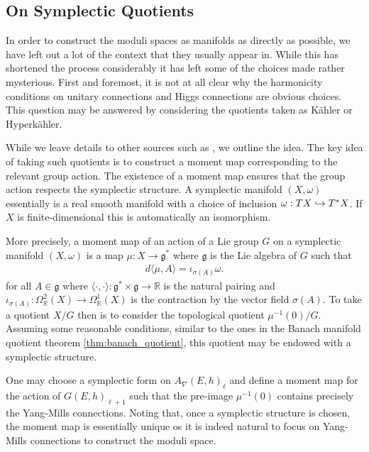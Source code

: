 \documentclass[12pt]{ociamthesis}  %
\begin{document}
\subsection{On Symplectic Quotients}\label{sec:symplectic_quotients}

In order to construct the moduli spaces as manifolds as directly as
possible, we have left out a lot of the context that they usually appear
in. While this has shortened the process considerably it has left
some of the choices made rather mysterious. First and foremost, it is
not at all clear why the harmonicity conditions on unitary connections and
Higgs connections are obvious choices. This question may be
answered by considering the quotients taken as K\"ahler or Hyperk\"ahler.

While we leave details to other sources such as \missingcitation,
we outline the idea. The key idea of taking such quotients is to
construct a moment map corresponding to the relevant group action.
The existence of a moment map ensures that the group action respects
the symplectic structure. A symplectic manifold $(X,\omega)$
essentially is a real smooth manifold with a choice of inclusion
$\omega : TX \hookrightarrow T^*X$. If $X$ is finite-dimensional this is
automatically an isomorphism.

More precisely, a moment map of an action of a Lie group $G$ on a symplectic manifold
$(X,\omega)$ is a map $\mu : X \to \mathfrak g^*$
where $\mathfrak g$ is the Lie algebra of $G$ such that
\begin{align*}
  d\langle\mu,A\rangle = \iota_{\sigma(A)}\omega.
\end{align*}
for all $A\in\mathfrak g$ where $\langle \cdot,\cdot\rangle : \mathfrak g^* \times \mathfrak g \to \mathbb R$
is the natural pairing and $\iota_{\sigma(A)} : \Omega^2_{\mathbb R}(X)\to \Omega^1_{\mathbb R}(X)$
is the contraction by the vector field $\sigma(A)$. To take a
quotient $X/G$ then is to consider the topological quotient $\mu^{-1}(0)/G$.
Assuming some reasonable conditions, similar to the ones
in the Banach manifold quotient theorem \ref{thm:banach_quotient},
this quotient may be endowed with a symplectic structure.

One may choose a symplectic form on $A_\nabla(E,h)_\ell$ and
define a moment map for the action of $G(E,h)_{\ell+1}$ such that the
pre-image $\mu^{-1}(0)$ contains precisely the Yang-Mills connections.
Noting that, once a symplectic structure is chosen, the moment map
is essentially unique os it is indeed natural to focus on Yang-Mills
connections to construct the moduli space.
\end{document}
